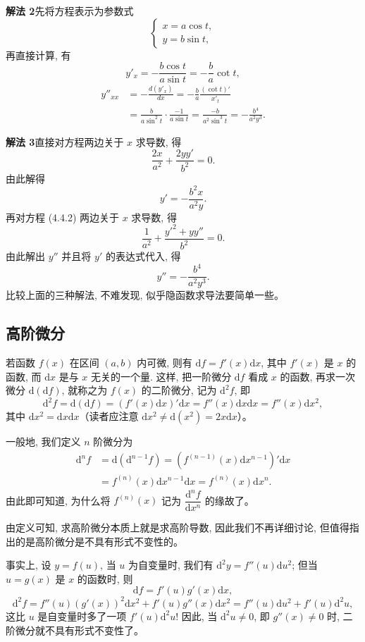 \documentclass[UTF8, 12pt, fontset=fandol, oneside]{ctexart}
\begin{document}
\noindent\textbf{解法 2}\quad 先将方程表示为参数式
\[
  \begin{cases}
    x=a\cos t,\\
    y=b\sin t,
  \end{cases}
\]
再直接计算, 有
\[
  y'_x=-\frac{b\cos t}{a\sin t}=-\frac{b}{a}\cot t,
\]
\[
\begin{aligned}
  y''_{xx}
  &=
  -\frac{d(y'_x)}{dx}
  =
  -\frac{b}{a}\frac{(\cot t)'}{x'_t}  \\
  &=
  \frac{b}{a\sin^2t}\cdot\frac{-1}{a\sin t}
  =
  \frac{-b}{a^2\sin^3t}
  =
  -\frac{b^4}{a^2y^3}.
\end{aligned}
\]

\noindent\textbf{解法 3}\quad 直接对方程两边关于 $x$ 求导数, 得
\[
  \frac{2x}{a^2}+\frac{2yy'}{b^2}=0. \tag{4.4.2}
\]
由此解得
\[
  y'=-\frac{b^2x}{a^2y}.
\]
再对方程 (4.4.2) 两边关于 $x$ 求导数, 得
\[
  \frac1{a^2}+\frac{y'^2+yy''}{b^2}=0.
\]
由此解出 $y''$ 并且将 $y'$ 的表达式代入, 得
\[
  y''=-\frac{b^4}{a^2y^3}.
\]
比较上面的三种解法, 不难发现, 似乎隐函数求导法要简单一些。

\subsection{高阶微分}

若函数 $f(x)$ 在区间 $(a,b)$ 内可微, 则有 $\mathrm df=f'(x)\mathrm dx$, 其中 $f'(x)$ 是 $x$ 的函数, 而 $\mathrm dx$ 是与 $x$ 无关的一个量. 这样, 把一阶微分 $\mathrm df$ 看成 $x$ 的函数, 再求一次微分 $\mathrm d(\mathrm df)$, 就称之为 $f(x)$ 的二阶微分, 记为 $\mathrm d^2f$, 即
\[
  \mathrm d^2f
  =
  \mathrm d(\mathrm df)
  =
  (f'(x)\mathrm dx)'\mathrm dx
  =
  f''(x)\mathrm dx\mathrm dx
  =
  f''(x)\mathrm dx^2,
\]
其中 $\mathrm dx^2=\mathrm dx\mathrm dx$（读者应注意 $\mathrm dx^2\ne \mathrm d(x^2)=2x\mathrm dx$）。

一般地, 我们定义 $n$ 阶微分为
\[
\begin{aligned}
  \mathrm d^nf
  &=
  \mathrm d(\mathrm d^{n-1}f)
  =
  (f^{(n-1)}(x)\mathrm dx^{n-1})'\mathrm dx  \\
  &=
  f^{(n)}(x)\mathrm dx^{n-1}\mathrm dx
  =
  f^{(n)}(x)\mathrm dx^n.
\end{aligned}
\]
由此即可知道, 为什么将 $f^{(n)}(x)$ 记为 $\dfrac{\mathrm d^nf}{\mathrm dx^n}$ 的缘故了。

由定义可知, 求高阶微分本质上就是求高阶导数, 因此我们不再详细讨论, 但值得指出的是高阶微分是不具有形式不变性的。

事实上, 设 $y=f(u)$, 当 $u$ 为自变量时, 我们有 $\mathrm d^2y=f''(u)\mathrm du^2$; 但当 $u=g(x)$ 是 $x$ 的函数时, 则
\[
  \mathrm df=f'(u)g'(x)\mathrm dx,
\]
\[
  \mathrm d^2f
  =
  f''(u)(g'(x))^2\mathrm dx^2+f'(u)g''(x)\mathrm dx^2
  =
  f''(u)\mathrm du^2+f'(u)\mathrm d^2u,
\]
这比 $u$ 是自变量时多了一项 $f'(u)\mathrm d^2u$! 因此, 当 $\mathrm d^2u\ne0$, 即 $g''(x)\ne0$ 时, 二阶微分就不具有形式不变性了。
\end{document}
